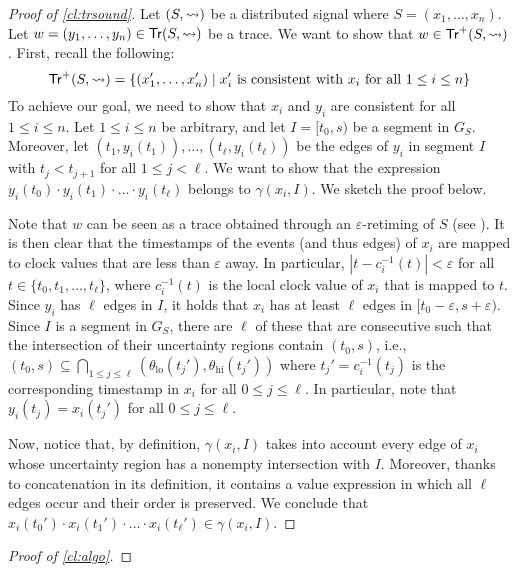 \begin{proof}[Proof of \cref{cl:trsound}]
	Let $(S,{\rightsquigarrow})$ be a distributed signal where $S = (x_1, \ldots, x_n)$.
	Let $w = (y_1, \ldots, y_n) \in \mathsf{Tr}(S,{\rightsquigarrow})$ be a trace.
	We want to show that $w \in \mathsf{Tr}^+(S,{\rightsquigarrow})$.
	First, recall the following:
	\[ \tr^+(S,{\hb}) = \{ (x_1', \ldots, x_n') \st \text{$x_i'$ is consistent with $x_i$ for all $1 \leq i \leq n$}\} \]
	To achieve our goal, we need to show that $x_i$ and $y_i$ are consistent for all $1 \leq i \leq n$.
	Let $1 \leq i \leq n$ be arbitrary, and let $I = [t_0, s)$ be a segment in $G_S$.
	Moreover, let $(t_1, y_i(t_1)), \ldots, (t_\ell, y_i(t_\ell))$ be the edges of $y_i$ in segment $I$ with $t_j < t_{j+1}$ for all $1 \leq j < \ell$.
	We want to show that the expression $y_i(t_0) \cdot y_i(t_1) \cdot \ldots \cdot y_i(t_\ell)$ belongs to $\gamma(x_i,I)$.
	We sketch the proof below.
	
	Note that $w$ can be seen as a trace obtained through an $\varepsilon$-retiming of $S$ (see \cite[Section 4.2]{MomtazAB23}).
	It is then clear that the timestamps of the events (and thus edges) of $x_i$ are mapped to clock values that are less than $\varepsilon$ away.
	In particular, $|t - c^{-1}_i(t)| < \varepsilon$ for all $t \in \{t_0, t_1, \ldots, t_\ell\}$, where $c^{-1}_i(t)$ is the local clock value of $x_i$ that is mapped to $t$.
	Since $y_i$ has $\ell$ edges in $I$, it holds that $x_i$ has at least $\ell$ edges in $[t_0 - \varepsilon, s + \varepsilon)$.
	Since $I$ is a segment in $G_S$, there are $\ell$ of these that are consecutive such that the intersection of their uncertainty regions contain $(t_0,s)$, i.e., $(t_0,s) \subseteq \bigcap_{1 \leq j \leq \ell} (\theta_{\text{lo}}(t_j'), \theta_{\text{hi}}(t_j'))$ where $t_j' = c^{-1}_i(t_j)$ is the corresponding timestamp in $x_i$ for all $0 \leq j \leq \ell$.
	In particular, note that $y_i(t_j) = x_i(t_j')$ for all $0 \leq j \leq \ell$.
		
	Now, notice that, by definition, $\gamma(x_i, I)$ takes into account every edge of $x_i$ whose uncertainty region has a nonempty intersection with $I$.
	Moreover, thanks to concatenation in its definition, it contains a value expression in which all $\ell$ edges occur and their order is preserved.
	We conclude that $x_i(t_0') \cdot x_i(t_1') \cdot \ldots \cdot x_i(t_\ell') \in \gamma(x_i, I)$.
\end{proof}

\begin{proof}[Proof of \cref{cl:algo}]
	\TODO
\end{proof}